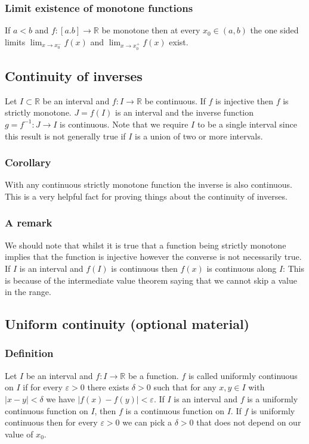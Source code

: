 \documentclass[12pt]{article}
\begin{document}
\subsubsection*{Limit existence of monotone functions}
If \(a<b\) and \(f:[a.b]\to\mathbb{R}\) be monotone then at every \(x_0\in(a,b)\) the one sided limits \(\lim_{x\to x_0^-}f(x)\) and \(\lim_{x\to x_0^+}f(x)\) exist.
\subsection*{Continuity of inverses}
Let \(I\subset \mathbb{R}\) be an interval and \(f:I\to\mathbb{R}\) be continuous. If \(f\) is injective then \(f\) is strictly monotone. \(J=f(I)\) is an interval and the inverse function \(g=f^{-1}:J\to I\) is continuous. Note that we require \(I\) to be a single interval since this result is not generally true if \(I\) is a union of two or more intervals.
\subsubsection*{Corollary}
With any continuous strictly monotone function the inverse is also continuous. This is a very helpful fact for proving things about the continuity of inverses.
\subsubsection*{A remark}
We should note that whilst it is true that a function being strictly monotone implies that the function is injective however the converse is not necessarily true. If \(I\) is an interval and \(f(I)\) is continuous then \(f(x)\) is continuous along \(I\): This is because of the intermediate value theorem saying that we cannot skip a value in the range. 
\subsection*{Uniform continuity (optional material)}
\subsubsection*{Definition}
Let \(I\) be an interval and \(f:I\to\mathbb{R}\) be a function. \(f\) is called uniformly continuous on \(I\) if for every \(\varepsilon>0\) there exists \(\delta>0\) such that for any \(x,y\in I\) with \(|x-y|<\delta\) we have \(|f(x)-f(y)|<\varepsilon\). If \(I\) is an interval and \(f\) is a uniformly continuous function on \(I\), then \(f\) is a continuous function on \(I\). If \(f\) is uniformly continuous then for every \(\varepsilon>0\) we can pick a \(\delta>0\) that does not depend on our value of \(x_0\).
\end{document}
